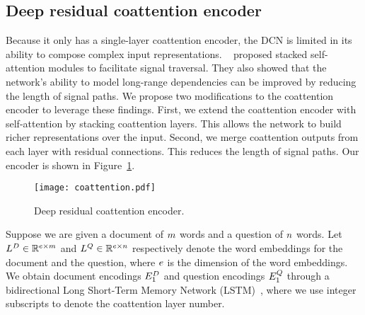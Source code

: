 \documentclass{article} %
\begin{document}
\subsection{Deep residual coattention encoder}

Because it only has a single-layer coattention encoder, the DCN is limited in its ability to compose complex input representations.
~\citet{Vaswani2017AttentionIA} proposed stacked self-attention modules to facilitate signal traversal.
They also showed that the network's ability to model long-range dependencies can be improved by reducing the length of signal paths.
We propose two modifications to the coattention encoder to leverage these findings.
First, we extend the coattention encoder with self-attention by stacking coattention layers.
This allows the network to build richer representations over the input.
Second, we merge coattention outputs from each layer with residual connections.
This reduces the length of signal paths.
Our encoder is shown in Figure~\ref{fig:coattention}.

\begin{figure}[t!] 
  \begin{center}
	\texttt{[image: coattention.pdf]}
  \end{center}
  \vspace{-2mm}
  \caption{
  Deep residual coattention encoder.
}\label{fig:coattention}
  \vspace{-2mm}
\end{figure}

Suppose we are given a document of $m$ words and a question of $n$ words.
Let $L^D \in \mathbb{R}^{e \times m}$ and $L^Q \in \mathbb{R}^{e \times n}$ respectively denote the word embeddings for the document and the question, where $e$ is the dimension of the word embeddings.
We obtain document encodings $E_1^D$ and question encodings $E_1^Q$ through a bidirectional Long Short-Term Memory Network (LSTM)~\citep{Hochreiter1997LongSM}, where we use integer subscripts to denote the coattention layer number.
\end{document}
